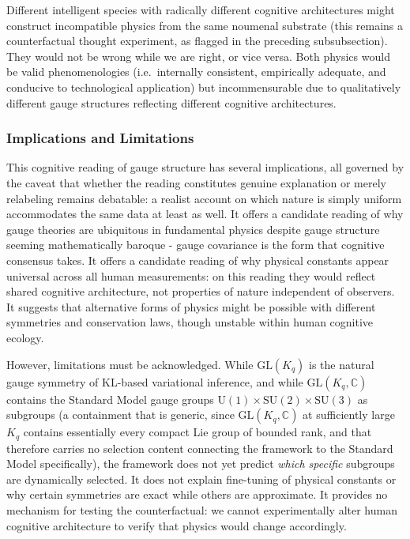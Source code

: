 \documentclass[11pt]{article}
\begin{document}
Different intelligent species with radically different cognitive architectures might construct incompatible physics from the same noumenal substrate (this remains a counterfactual thought experiment, as flagged in the preceding subsubsection). They would not be wrong while we are right, or vice versa. Both physics would be valid phenomenologies (i.e.\ internally consistent, empirically adequate, and conducive to technological application) but incommensurable due to qualitatively different gauge structures reflecting different cognitive architectures.

\subsubsection{Implications and Limitations}

This cognitive reading of gauge structure has several implications, all governed by the caveat that whether the reading constitutes genuine explanation or merely relabeling remains debatable: a realist account on which nature is simply uniform accommodates the same data at least as well. It offers a candidate reading of why gauge theories are ubiquitous in fundamental physics despite gauge structure seeming mathematically baroque - gauge covariance is the form that cognitive consensus takes. It offers a candidate reading of why physical constants appear universal across all human measurements: on this reading they would reflect shared cognitive architecture, not properties of nature independent of observers. It suggests that alternative forms of physics might be possible with different symmetries and conservation laws, though unstable within human cognitive ecology.

However, limitations must be acknowledged. While $\mathrm{GL}(K_q)$ is the natural gauge symmetry of KL-based variational inference, and while $\mathrm{GL}(K_q, \mathbb{C})$ contains the Standard Model gauge groups $\mathrm{U}(1) \times \mathrm{SU}(2) \times \mathrm{SU}(3)$ as subgroups (a containment that is generic, since $\mathrm{GL}(K_q, \mathbb{C})$ at sufficiently large $K_q$ contains essentially every compact Lie group of bounded rank, and that therefore carries no selection content connecting the framework to the Standard Model specifically), the framework does not yet predict \emph{which specific} subgroups are dynamically selected. It does not explain fine-tuning of physical constants or why certain symmetries are exact while others are approximate. It provides no mechanism for testing the counterfactual: we cannot experimentally alter human cognitive architecture to verify that physics would change accordingly.
\end{document}
